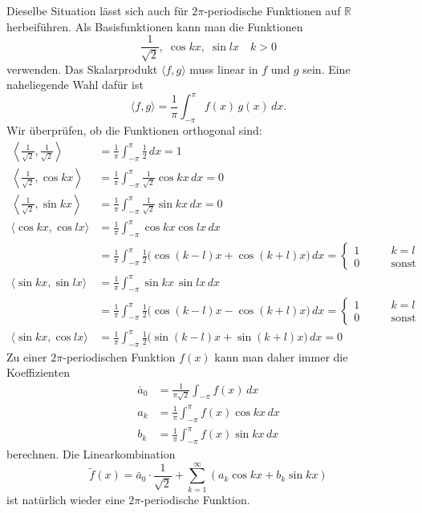 Dieselbe Situation lässt sich auch für $2\pi$-periodische Funktionen 
auf $\mathbb R$ herbeiführen.
Als Basisfunktionen kann man die Funktionen 
\begin{equation}
\frac{1}{\sqrt{2}},\; \cos kx,\; \sin lx\quad k>0
\label{fourier:basis}
\end{equation}
verwenden.
Das Skalarprodukt $\langle f,g\rangle$ muss linear in $f$ und $g$ sein.
Eine naheliegende Wahl dafür ist
\[
\langle f, g\rangle
=
\frac{1}{\pi}\int_{-\pi}^{\pi} f(x)\,g(x)\,dx.
\]
Wir überprüfen, ob die Funktionen orthogonal sind:
\begin{align*}
\left\langle \frac1{\sqrt{2}},\frac1{\sqrt{2}}\right\rangle
&=
\frac1{\pi}
\int_{-\pi}^{\pi} \frac12\,dx
=
1
\\
\left\langle \frac1{\sqrt{2}},\cos kx\right\rangle
&=
\frac1{\pi}\int_{-\pi}^{\pi}
\frac1{\sqrt{2}}\cos kx
\,dx
=0
\\
\left\langle \frac1{\sqrt{2}},\sin kx\right\rangle
&=
\frac1{\pi}\int_{-\pi}^{\pi}
\frac1{\sqrt{2}}\sin kx
\,dx
=0
\\
\langle \cos kx,\cos lx\rangle
&=
\frac1{\pi}
\int_{-\pi}^\pi \cos kx\cos lx\,dx
\\
&=
\frac1{\pi}
\int_{-\pi}^\pi
\frac12\bigl(
\cos (k-l)x+\cos (k+l)x
\bigr)
\,dx
=
\begin{cases}
1&\qquad k=l\\
0&\qquad\text{sonst}
\end{cases}
\\
\langle \sin kx,\sin lx\rangle
&=
\frac1{\pi}
\int_{-\pi}^\pi \sin kx\,\sin lx\,dx
\\
&=
\frac1{\pi}
\int_{-\pi}^\pi
\frac12
\bigl(
\cos (k-l)x - \cos (k+l)x
\bigr)
\,dx
=
\begin{cases}
1&\qquad k=l\\
0&\qquad\text{sonst}
\end{cases}
\\
\langle \sin kx,\cos lx\rangle
&=
\frac1{\pi}
\int_{-\pi}^{\pi} 
\frac12\bigl(
\sin (k-l)x + \sin (k+l)x
\bigr)
\,dx
=0
\end{align*}
Zu einer $2\pi$-periodischen Funktion $f(x)$ kann man daher immer
die Koeffizienten
\begin{equation}
\begin{aligned}
\bar{a}_0&=\frac1{\pi\sqrt{2}}\int_{-\pi}f(x)\,dx
\\
a_k&=\frac1{\pi}\int_{-\pi}^\pi f(x)\cos kx\,dx
\\
b_k&=\frac1{\pi}\int_{-\pi}^\pi f(x)\sin kx\,dx
\end{aligned}
\label{fourier:normalekoeffizienten}
\end{equation}
berechnen.
Die Linearkombination
\begin{equation}
\tilde f(x)
=
\bar{a}_0\cdot\frac1{\sqrt{2}}
+ 
\sum_{k=1}^\infty (a_k\cos kx+b_k\sin kx)
\label{fourier:reihe}
\end{equation}
ist natürlich wieder eine $2\pi$-periodische Funktion.

